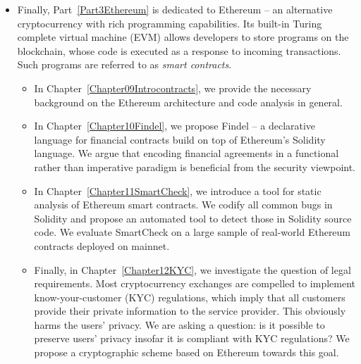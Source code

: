 \begin{itemize}
	\item
	Finally, Part~\ref{Part3Ethereum} is dedicated to Ethereum -- an alternative cryptocurrency with rich programming capabilities.
	Its built-in Turing complete virtual machine (EVM) allows developers to store programs on the blockchain, whose code is executed as a response to incoming transactions.
	Such programs are referred to as \textit{smart contracts}.
	\begin{itemize}
		\item 
	In Chapter~\ref{Chapter09Introcontracts}, we provide the necessary background on the Ethereum architecture and code analysis in general.
		\item
	In Chapter~\ref{Chapter10Findel}, we propose Findel -- a declarative language for financial contracts build on top of Ethereum's Solidity language.
	We argue that encoding financial agreements in a functional rather than imperative paradigm is beneficial from the security viewpoint.
		\item
	In Chapter~\ref{Chapter11SmartCheck}, we introduce a tool for static analysis of Ethereum smart contracts.
	We codify all common bugs in Solidity and propose an automated tool to detect those in Solidity source code.
	We evaluate SmartCheck on a large sample of real-world Ethereum contracts deployed on mainnet.
		\item
	Finally, in Chapter~\ref{Chapter12KYC}, we investigate the question of legal requirements.
	Most cryptocurrency exchanges are compelled to implement know-your-customer (KYC) regulations, which imply that all customers provide their private information to the service provider.
	This obviously harms the users' privacy.
	We are asking a question: is it possible to preserve users' privacy insofar it is compliant with KYC regulations?
	We propose a cryptographic scheme based on Ethereum towards this goal.
	
	\end{itemize}
\end{itemize}















